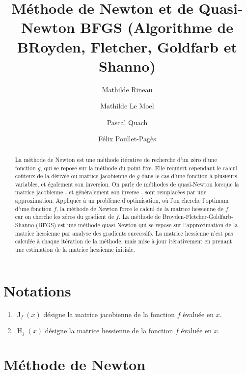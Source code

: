 \documentclass[3p, twocolumn]{elsarticle}
\DeclareMathOperator{\Hessian}{H}
\DeclareMathOperator{\Jacobian}{J}
\begin{document}
\begin{frontmatter}
    \title{Méthode de Newton et de Quasi-Newton BFGS (Algorithme de BRoyden, Fletcher, Goldfarb et Shanno)}
    \author{Mathilde Rineau}
    \author{Mathilde Le Moel}
    \author{Pascal Quach}
    \author{Félix Poullet-Pagès}

    \begin{abstract}
        La méthode de Newton est une méthode itérative de recherche d'un zéro d'une fonction $g$, qui se repose sur la méthode du point fixe. Elle requiert cependant le calcul coûteux de la dérivée ou matrice jacobienne de $g$ dans le cas d'une fonction à plusieurs variables, et également son inversion. On parle de méthodes de quasi-Newton lorsque la matrice jacobienne - et généralement son inverse - sont remplacées par une approximation. Appliquée à un problème d'optimisation, où l'on cherche l'optimum d'une fonction $f$, la méthode de Newton force le calcul de la matrice hessienne de $f$, car on cherche les zéros du gradient de $f$. La méthode de Broyden-Fletcher-Goldfarb-Shanno (BFGS) est une méthode quasi-Newton qui se repose sur l'approximation de la matrice hessienne par analyse des gradients successifs. La matrice hessienne n'est pas calculée à chaque itération de la méthode, mais mise à jour itérativement en prenant une estimation de la matrice hessienne initiale.
    \end{abstract}
\end{frontmatter}
\newpage
\tableofcontents
\newpage

\clearpage
\section{Notations}
\begin{enumerate}
    \item $\Jacobian_{f}(x)$ désigne la matrice jacobienne de la fonction $f$ évaluée en $x$.
    \item $\Hessian_{f}(x)$ désigne la matrice hessienne de la fonction $f$ évaluée en $x$.
\end{enumerate}
\section{Méthode de Newton}
\end{document}
